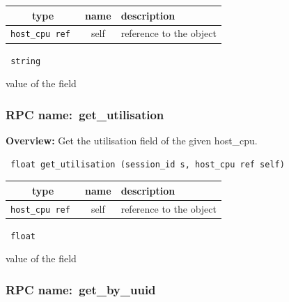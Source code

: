 
 
\vspace{0.3cm}
\begin{tabular}{|c|c|p{7cm}|}
 \hline
{\bf type} & {\bf name} & {\bf description} \\ \hline
{\tt host\_cpu ref } & self & reference to the object \\ \hline 

\end{tabular}

\vspace{0.3cm}

{\tt 
string
}


value of the field
\vspace{0.3cm}
\vspace{0.3cm}
\vspace{0.3cm}
\subsubsection{RPC name:~get\_utilisation}

{\bf Overview:} 
Get the utilisation field of the given host\_cpu.

\begin{verbatim} float get_utilisation (session_id s, host_cpu ref self)\end{verbatim}



 
\vspace{0.3cm}
\begin{tabular}{|c|c|p{7cm}|}
 \hline
{\bf type} & {\bf name} & {\bf description} \\ \hline
{\tt host\_cpu ref } & self & reference to the object \\ \hline 

\end{tabular}

\vspace{0.3cm}

{\tt 
float
}


value of the field
\vspace{0.3cm}
\vspace{0.3cm}
\vspace{0.3cm}
\subsubsection{RPC name:~get\_by\_uuid}

